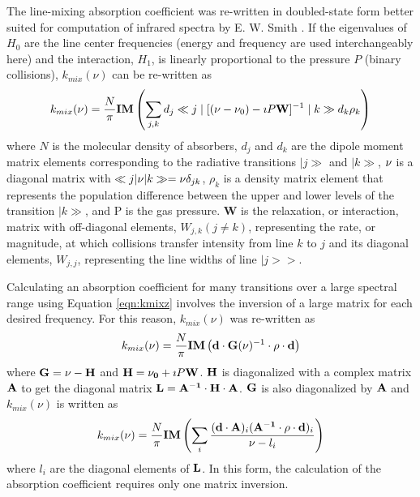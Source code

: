 \documentclass[11pt]{article}
\begin{document}
The line-mixing absorption coefficient was re-written in doubled-state form 
better suited for computation of infrared spectra by E. W. Smith
\cite{smi:81}.  If the eigenvalues of $H_{0}$
are the line center frequencies (energy and frequency are used
interchangeably here) and the interaction, $H_{1}$, is linearly
proportional to the pressure $P$ (binary collisions), $k_{mix}(\nu)$
can be re-written as\cite{str:88*1,smi:81,ben:75}
\begin{equation} 
k_{mix}(\nu)=\frac{N}{\pi} {\bf IM} \left( \sum_{j,k} d_{j}\ll 
j\mid
[(\nu-\nu_{0})-\imath P{\bf W}]^{-1} \mid k\gg d_{k}\rho_{k}\right)
\label{eqn:kmixz}
\end{equation}
where $N$ is the molecular density of absorbers, $d_{j}$ and $d_{k}$ are the
dipole moment matrix elements corresponding to the radiative transitions
$|j\gg$ and $|k\gg$, ${\bf \nu}$ is a diagonal matrix with 
$\ll j|{\bf \nu}|k\gg =\nu\delta_{jk}$, $\rho_{k}$ is a density matrix
element  that represents the population difference between the upper and
lower levels of the transition $|k\gg$, and P is the gas pressure. {\bf W}
is the relaxation, or interaction, matrix with off-diagonal 
elements, $W_{j,k}(j\neq k)$, representing the rate, or magnitude, at which
collisions transfer intensity from line $k$ to $j$ and its diagonal 
elements, $W_{j,j}$, representing the line widths of line $|j>>$.

Calculating an absorption coefficient for many transitions over a
large spectral range using Equation \ref{eqn:kmixz} involves the inversion
of a large matrix for each desired frequency.  For this reason, 
$k_{mix}(\nu)$ was re-written as \cite{gor:67}
\begin{equation} 
k_{mix}(\nu)=\frac{N}{\pi} {\bf IM} \left({\bf d}\cdot{\bf G}({
\bf
  \nu})^{-1} \cdot{\bf \rho}\cdot{\bf d}\right)
\end{equation}
where ${\bf G}={\bf \nu}-{\bf H}$ and 
${\bf H}={\bf \nu_{0}}+\imath P{\bf W}$.
${\bf H}$ is diagonalized with a complex matrix ${\bf A}$ to get the 
diagonal matrix ${\bf L}={\bf A^{-1}}\cdot{\bf H}\cdot{\bf A}$.
${\bf G}$ is also diagonalized by ${\bf A}$ and $k_{mix}(\nu)$ is written
as
\begin{equation} 
k_{mix}(\nu)=\frac{N}{\pi} {\bf IM} \left(\sum_{i}\frac{({\bf d
\cdot
    A})_{i} ({\bf A^{-1}\cdot\rho\cdot d})_{i}}{\nu - l_{i}}\right)
\label{eqn:kmix2}
\end{equation}
where $l_{i}$ are the diagonal elements of ${\bf L}$.  In this form, the 
calculation of the absorption coefficient requires only one matrix 
inversion.
\end{document}
